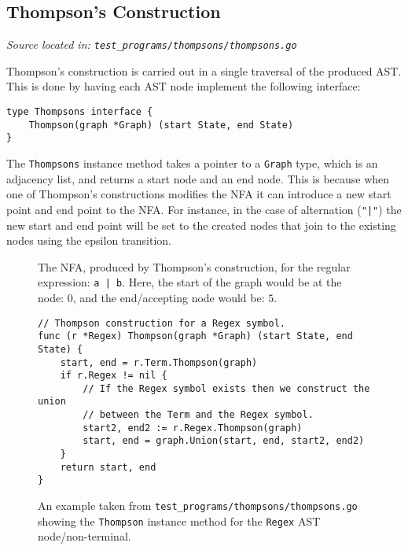 \subsection{Thompson's Construction}
\cprotect\textit{Source located in: \verb|test_programs/thompsons/thompsons.go|}

Thompson's construction is carried out in a single traversal of the produced AST. This is done by having each AST node implement the following interface:

\begin{verbatim}
type Thompsons interface {
    Thompson(graph *Graph) (start State, end State)
}
\end{verbatim}

The \verb|Thompsons| instance method takes a pointer to a \verb|Graph| type, which is an adjacency list, and returns a start node and an end node. This is because when one of Thompson's constructions modifies the NFA it can introduce a new start point and end point to the NFA. For instance, in the case of alternation (\verb+"|"+) the new start and end point will be set to the created nodes that join to the existing nodes using the epsilon transition.

\begin{figure}[!h]
    \centering
    \cprotect\caption{The NFA, produced by Thompson's construction, for the regular expression: \verb+a | b+. Here, the start of the graph would be at the node: $0$, and the end/accepting node would be: $5$.}
\end{figure}

\begin{figure}[H]
    \begin{verbatim}
// Thompson construction for a Regex symbol.
func (r *Regex) Thompson(graph *Graph) (start State, end State) {
    start, end = r.Term.Thompson(graph)
    if r.Regex != nil {
        // If the Regex symbol exists then we construct the union
        // between the Term and the Regex symbol.
        start2, end2 := r.Regex.Thompson(graph)
        start, end = graph.Union(start, end, start2, end2)
    }
    return start, end
}
    \end{verbatim}
    \cprotect\caption{An example taken from \verb|test_programs/thompsons/thompsons.go| showing the \verb|Thompson| instance method for the \verb|Regex| AST node/non-terminal.}
\end{figure}

